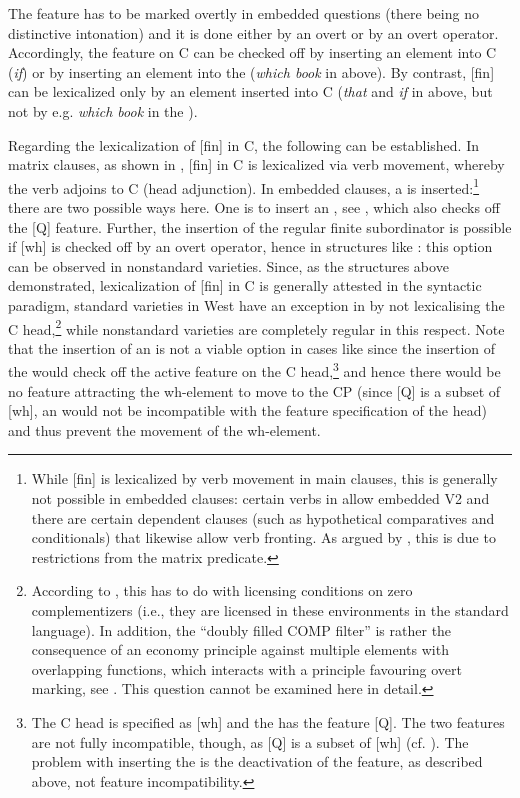 \documentclass[output=paper,modfonts, hidelinks, newtxmath]{langscibook}
\begin{document}
\noindent The  feature has to be marked overtly in embedded questions (there being no distinctive  intonation) and it is done either by an overt  or by an overt operator. Accordingly, the  feature on C can be checked off by inserting an element into C (\textit{if}) or by inserting an element into the  (\textit{which book} in  above). By contrast, [fin] can be lexicalized only by an element inserted into C (\textit{that} and \textit{if} in  above, but not by e.g. \textit{which book} in the ).

Regarding the lexicalization of [fin] in C, the following can be established. In matrix clauses, as shown in , [fin] in C is lexicalized via verb movement, whereby the verb adjoins to C (head adjunction). In embedded clauses, a  is inserted:\footnote{While [fin] is lexicalized by verb movement in main clauses, this is generally not possible in embedded clauses: certain verbs in  allow embedded V2 and there are certain dependent clauses (such as hypothetical comparatives and conditionals) that likewise allow verb fronting. As argued by \citet{bacskaiatkaritoappear}, this is due to restrictions from the matrix predicate.} there are two possible ways here. One is to insert an  , see , which also checks off the [Q] feature. Further, the insertion of the regular finite subordinator is possible if [wh] is checked off by an overt operator, hence in structures like : this option can be observed in nonstandard varieties. Since, as the structures above demonstrated, lexicalization of [fin] in C is generally attested in the syntactic paradigm, standard varieties in West  have an exception in  by not lexicalising the C head,\footnote{According to \citet{bacskaiatkaritoappear}, this has to do with licensing conditions on zero complementizers (i.e., they are licensed in these environments in the standard language). In addition, the ``doubly filled COMP filter'' is rather the consequence of an economy principle against multiple elements with overlapping functions, which interacts with a principle favouring overt marking, see \citet{vangelderen2009}. This question cannot be examined here in detail.} while nonstandard varieties are completely regular in this respect. Note that the insertion of an   is not a viable option in cases like  since the insertion of the  would check off the active  feature on the C head,\footnote{The C head is specified as [wh] and the  has the feature [Q]. The two features are not fully incompatible, though, as [Q] is a subset of [wh] (cf. \citealt{bayer2004}). The problem with inserting the  is the deactivation of the feature, as described above, not feature incompatibility.} and hence there would be no feature attracting the wh-element to move to the CP (since [Q] is a subset of [wh], an   would not be incompatible with the feature specification of the head) and thus prevent the movement of the wh-element.
\end{document}
